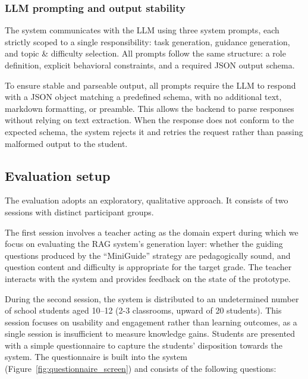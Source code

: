 \subsubsection{LLM prompting and output stability}

The system communicates with the LLM using three system prompts, each strictly scoped to a single responsibility: task generation, guidance generation, and topic \& difficulty selection. All prompts follow the same structure: a role definition, explicit behavioral constraints, and a required JSON output schema.

To ensure stable and parseable output, all prompts require the LLM to respond with a JSON object matching a predefined schema, with no additional text, markdown formatting, or preamble. This allows the backend to parse responses without relying on text extraction. When the response does not conform to the expected schema, the system rejects it and retries the request rather than passing malformed output to the student.

\subsection{Evaluation setup}


The evaluation adopts an exploratory, qualitative approach. It consists of two sessions with distinct participant groups.

The first session involves a teacher acting as the domain expert during which we focus on evaluating the RAG system's generation layer: whether the guiding questions produced by the \enquote{MiniGuide} strategy are pedagogically sound, and question content and difficulty is appropriate for the target grade. The teacher interacts with the system and provides feedback on the state of the prototype.

During the second session, the system is distributed to an undetermined number of school students aged 10--12 (2-3 classrooms, upward of 20 students). This session focuses on usability and engagement rather than learning outcomes, as a single session is insufficient to measure knowledge gains. Students are presented with a simple questionnaire to capture the students' disposition towards the system. The questionnaire is built into the system (Figure~\ref{fig:questionnaire_screen}) and consists of the following questions:

